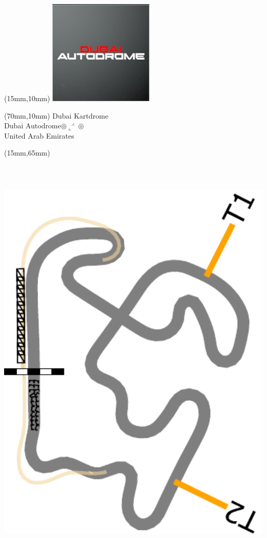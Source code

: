 \null\newpage
\begin{textblock*}{50mm}(15mm,10mm)%
\includegraphics[width=50mm]{LG/2015-05-20_00081.png}
\end{textblock*}
\begin{textblock*}{130mm}(70mm,10mm)%
{\fontsize{20}{20}\selectfont Dubai Kartdrome\\}
{\fontsize{16}{16}\selectfont Dubai Autodrome\hfill $\circledcirc\llcorner^{\rightthreetimes}\circledcirc$\\}
{\fontsize{12}{12}\selectfont United Arab Emirates\\}
\end{textblock*}
\begin{textblock*}{185mm}(15mm,65mm)%
\centering
\mbox{\includegraphics[width=185mm,height=210mm,keepaspectratio]{PT/DUAUKD.pdf}}
\end{textblock*}

